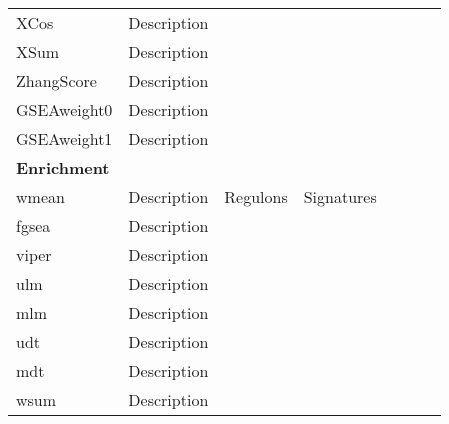 \begin{xltabular}{\textwidth}{Xcccccc}
XCos           & Description &              &              & ~\cite{cmap} \\
XSum           & Description &              &              & ~\cite{cmap} \\
ZhangScore     & Description &              &              & ~\cite{cmap} \\
GSEAweight0    & Description &              &              & ~\cite{cmap} \\
GSEAweight1    & Description &              &              & ~\cite{cmap} \\
\midrule
\textbf{Enrichment} \\
wmean   & Description  & Regulons     & Signatures  & ~\cite{cbdd} \\
fgsea   & Description  &              &             & ~\cite{fgsea} \\
viper   & Description  &              &             & ~\cite{viper} \\
ulm     & Description  &              &             & ~\cite{cbdd} \\
mlm     & Description  &              &             & ~\cite{cbdd} \\
udt     & Description  &              &             & ~\cite{cbdd} \\
mdt     & Description  &              &             & ~\cite{cbdd} \\
wsum    & Description  &              &             & ~\cite{fgsea} \\
\bottomrule
\end{xltabular}
\egroup


